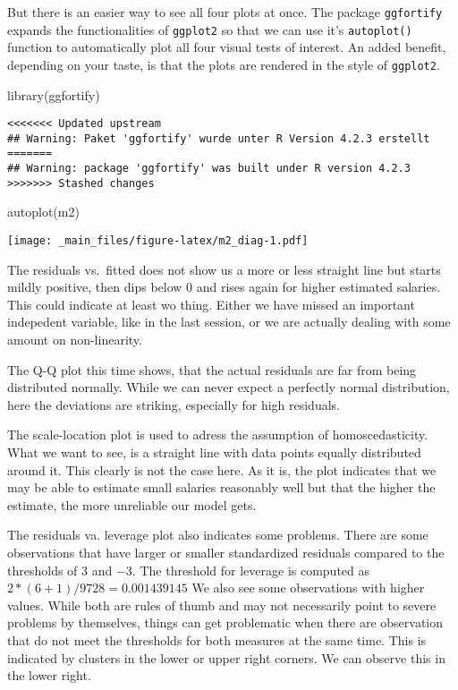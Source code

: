 \documentclass[
]{book}
\newenvironment{Shaded}{\begin{snugshade}}{\end{snugshade}}
\newcommand{\FunctionTok}[1]{\textcolor[rgb]{0.00,0.00,0.00}{#1}}
\newcommand{\FunctionTok}[1]{\textcolor[rgb]{0.13,0.29,0.53}{\textbf{#1}}}
\newcommand{\NormalTok}[1]{#1}
\begin{document}
But there is an easier way to see all four plots at once. The package
\texttt{ggfortify} expands the functionalities of \texttt{ggplot2} so that we can use it's
\texttt{autoplot()} function to automatically plot all four visual tests of interest.
An added benefit, depending on your taste, is that the plots are rendered in the
style of \texttt{ggplot2}.

\begin{Shaded}
\begin{Highlighting}[]
\FunctionTok{library}\NormalTok{(ggfortify)}
\end{Highlighting}
\end{Shaded}

\begin{verbatim}
<<<<<<< Updated upstream
## Warning: Paket 'ggfortify' wurde unter R Version 4.2.3 erstellt
=======
## Warning: package 'ggfortify' was built under R version 4.2.3
>>>>>>> Stashed changes
\end{verbatim}

\begin{Shaded}
\begin{Highlighting}[]
\FunctionTok{autoplot}\NormalTok{(m2)}
\end{Highlighting}
\end{Shaded}

\texttt{[image: \_main\_files/figure-latex/m2\_diag-1.pdf]}

The residuals vs.~fitted does not show us a more or less straight line but
starts mildly positive, then dips below \(0\) and rises again for higher estimated
salaries. This could indicate at least wo thing. Either we have missed an
important indepedent variable, like in the last session, or we are actually
dealing with some amount on non-linearity.

The Q-Q plot this time shows, that the actual residuals are far from being
distributed normally. While we can never expect a perfectly normal distribution,
here the deviations are striking, especially for high residuals.

The scale-location plot is used to adress the assumption of homoscedasticity.
What we want to see, is a straight line with data points equally distributed
around it. This clearly is not the case here. As it is, the plot indicates
that we may be able to estimate small salaries reasonably well but that the
higher the estimate, the more unreliable our model gets.

The residuals va. leverage plot also indicates some problems. There are some
observations that have larger or smaller standardized residuals compared to the
thresholds of \(3\) and \(-3\). The threshold for leverage is computed as
\(2 * (6 + 1) / 9728 = 0.001439145\) We also see some observations with higher
values. While both are rules of thumb and may not necessarily point to severe
problems by themselves, things can get problematic when there are observation
that do not meet the thresholds for both measures at the same time. This is
indicated by clusters in the lower or upper right corners. We can observe this
in the lower right.
\end{document}
